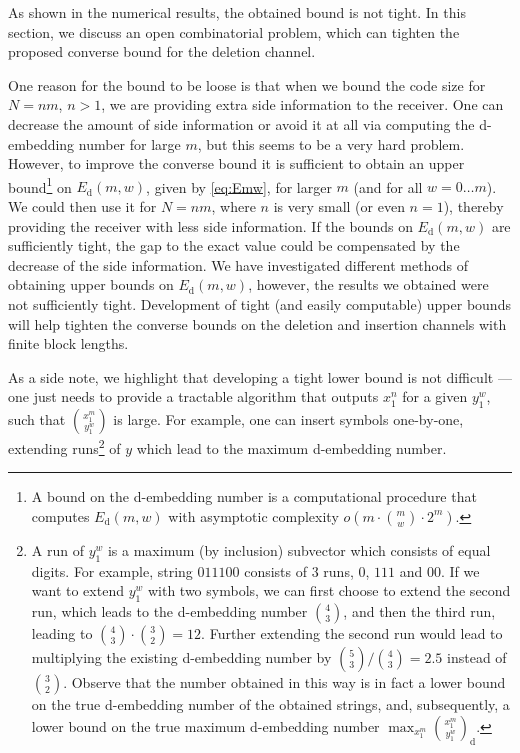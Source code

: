 \documentclass[journal, twocol]{IEEEtran}
\begin{document}
As shown in the numerical results, the obtained bound is not tight.
In this section, we discuss an open combinatorial problem, which can tighten the proposed converse bound for the deletion channel.

One reason for the bound to be loose is that when we bound the code size for $N=nm$, $n>1$, we are providing extra side information to the receiver.
One can decrease the amount of side information or avoid it at all via computing the d-embedding number for large $m$, but this seems to be a very hard problem.
However, to improve the converse bound it is sufficient to obtain an upper bound\footnote{A bound on the d-embedding number is a computational procedure that computes $E_\text{d}(m,w)$ with asymptotic complexity $o(m \cdot \binom{m}{w}\cdot 2^m)$.} on $E_\text{d}(m,w)$, given by \eqref{eq:Emw}, for larger $m$ (and for all $w=0\dots m$).
We could then use it for $N=nm$, where $n$ is very small (or even $n=1$), thereby providing the receiver with less side information.
If the bounds on $E_\text{d}(m,w)$ are sufficiently tight, the gap to the exact value could be compensated by the decrease of the side information.
We have investigated different methods of obtaining upper bounds on $E_\text{d}(m,w)$, however, the results we obtained were not sufficiently tight. Development of tight (and easily computable) upper bounds will help tighten the converse bounds on the deletion and insertion channels with finite block lengths.

As a side note, we highlight that developing a tight lower bound is not difficult --- one just needs to provide a tractable algorithm that outputs $x_1^n$ for a given $y_1^w$, such that $\binom{x_1^m}{y_1^w}$ is large. 
For example, one can insert symbols one-by-one, extending runs\footnote{A run of $y_1^w$ is a maximum (by inclusion) subvector which consists of equal digits. For example, string $011100$ consists of $3$ runs, $0$, $111$ and $00$. If we want to extend $y_1^w$ with two symbols, we can first choose to extend the second run, which leads to the d-embedding number $\binom{4}{3}$, and then the third run, leading to $\binom{4}{3}\cdot \binom{3}{2}=12$. Further extending the second run would lead to multiplying the existing d-embedding number by $\binom{5}{3}/\binom{4}{3}=2.5$ instead of $\binom{3}{2}$. Observe that the number obtained in this way is in fact a lower bound on the true d-embedding number of the obtained strings, and, subsequently, a lower bound on the true maximum d-embedding number $\displaystyle\max_{x_1^m}\binom{x_1^m}{y_1^w}_\text{d}$.} of $y$ which lead to the maximum d-embedding number.
\end{document}
